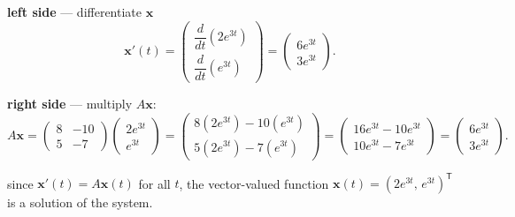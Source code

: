 \documentclass[12pt]{article}
\begin{document}
\textbf{left side} --- differentiate $\mathbf{x}$ 
\[
    \mathbf{x}'(t)
    = \begin{pmatrix} \dfrac{d}{dt}(2e^{3t}) \\[6pt] \dfrac{d}{dt}(e^{3t}) \end{pmatrix}
    = \begin{pmatrix} 6e^{3t} \\ 3e^{3t} \end{pmatrix}.
\]
 
\textbf{right side} --- multiply $A\mathbf{x}$:
\[
    A\mathbf{x}
    = \begin{pmatrix} 8 & -10 \\ 5 & -7 \end{pmatrix}
      \begin{pmatrix} 2e^{3t} \\ e^{3t} \end{pmatrix}
    = \begin{pmatrix} 8(2e^{3t}) - 10(e^{3t}) \\ 5(2e^{3t}) - 7(e^{3t}) \end{pmatrix}
    = \begin{pmatrix} 16e^{3t} - 10e^{3t} \\ 10e^{3t} - 7e^{3t} \end{pmatrix}
    = \begin{pmatrix} 6e^{3t} \\ 3e^{3t} \end{pmatrix}.
\]
 
since $\mathbf{x}'(t) = A\mathbf{x}(t)$ for all $t$, the vector-valued
function $\mathbf{x}(t) = (2e^{3t},\, e^{3t})^{\mathsf{T}}$ is a
solution of the system. 
\end{document}
